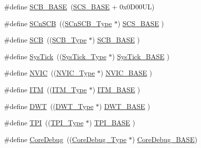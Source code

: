 \begin{DoxyCompactItemize}
\item 
\#define \hyperlink{group___c_m_s_i_s__core__base_gad55a7ddb8d4b2398b0c1cfec76c0d9fd}{S\-C\-B\-\_\-\-B\-A\-S\-E}~(\hyperlink{group___c_m_s_i_s__core__base_ga3c14ed93192c8d9143322bbf77ebf770}{S\-C\-S\-\_\-\-B\-A\-S\-E} +  0x0\-D00\-U\-L)
\item 
\#define \hyperlink{group___c_m_s_i_s__core__base_ga9fe0cd2eef83a8adad94490d9ecca63f}{S\-Cn\-S\-C\-B}~((\hyperlink{struct_s_cn_s_c_b___type}{S\-Cn\-S\-C\-B\-\_\-\-Type}    $\ast$)     \hyperlink{group___c_m_s_i_s__core__base_ga3c14ed93192c8d9143322bbf77ebf770}{S\-C\-S\-\_\-\-B\-A\-S\-E}      )
\item 
\#define \hyperlink{group___c_m_s_i_s__core__base_gaaaf6477c2bde2f00f99e3c2fd1060b01}{S\-C\-B}~((\hyperlink{struct_s_c_b___type}{S\-C\-B\-\_\-\-Type}       $\ast$)     \hyperlink{group___c_m_s_i_s__core__base_gad55a7ddb8d4b2398b0c1cfec76c0d9fd}{S\-C\-B\-\_\-\-B\-A\-S\-E}      )
\item 
\#define \hyperlink{group___c_m_s_i_s__core__base_gacd96c53beeaff8f603fcda425eb295de}{Sys\-Tick}~((\hyperlink{struct_sys_tick___type}{Sys\-Tick\-\_\-\-Type}   $\ast$)     \hyperlink{group___c_m_s_i_s__core__base_ga58effaac0b93006b756d33209e814646}{Sys\-Tick\-\_\-\-B\-A\-S\-E}  )
\item 
\#define \hyperlink{group___c_m_s_i_s__core__base_gac8e97e8ce56ae9f57da1363a937f8a17}{N\-V\-I\-C}~((\hyperlink{struct_n_v_i_c___type}{N\-V\-I\-C\-\_\-\-Type}      $\ast$)     \hyperlink{group___c_m_s_i_s__core__base_gaa0288691785a5f868238e0468b39523d}{N\-V\-I\-C\-\_\-\-B\-A\-S\-E}     )
\item 
\#define \hyperlink{group___c_m_s_i_s__core__base_gabae7cdf882def602cb787bb039ff6a43}{I\-T\-M}~((\hyperlink{struct_i_t_m___type}{I\-T\-M\-\_\-\-Type}       $\ast$)     \hyperlink{group___c_m_s_i_s__core__base_gadd76251e412a195ec0a8f47227a8359e}{I\-T\-M\-\_\-\-B\-A\-S\-E}      )
\item 
\#define \hyperlink{group___c_m_s_i_s__core__base_gabbe5a060185e1d5afa3f85b14e10a6ce}{D\-W\-T}~((\hyperlink{struct_d_w_t___type}{D\-W\-T\-\_\-\-Type}       $\ast$)     \hyperlink{group___c_m_s_i_s__core__base_gafdab534f961bf8935eb456cb7700dcd2}{D\-W\-T\-\_\-\-B\-A\-S\-E}      )
\item 
\#define \hyperlink{group___c_m_s_i_s__core__base_ga8b4dd00016aed25a0ea54e9a9acd1239}{T\-P\-I}~((\hyperlink{struct_t_p_i___type}{T\-P\-I\-\_\-\-Type}       $\ast$)     \hyperlink{group___c_m_s_i_s__core__base_ga2b1eeff850a7e418844ca847145a1a68}{T\-P\-I\-\_\-\-B\-A\-S\-E}      )
\item 
\#define \hyperlink{group___c_m_s_i_s__core__base_gab6e30a2b802d9021619dbb0be7f5d63d}{Core\-Debug}~((\hyperlink{struct_core_debug___type}{Core\-Debug\-\_\-\-Type} $\ast$)     \hyperlink{group___c_m_s_i_s__core__base_ga680604dbcda9e9b31a1639fcffe5230b}{Core\-Debug\-\_\-\-B\-A\-S\-E})
\end{DoxyCompactItemize}


